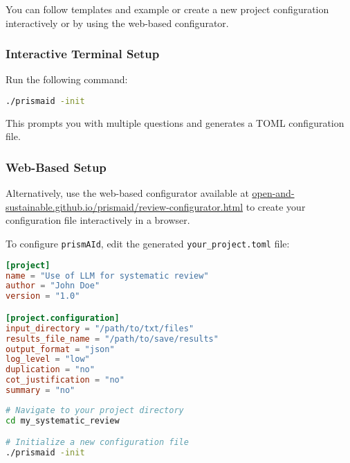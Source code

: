 You can follow templates and example or create a new project configuration interactively or by using the web-based configurator.

\subsubsection{Interactive Terminal Setup}
\begin{commandbox}
Run the following command:
\begin{lstlisting}[language=Bash]
./prismaid -init
\end{lstlisting}
\end{commandbox}

This prompts you with multiple questions and generates a TOML configuration file.

\subsubsection{Web-Based Setup}

Alternatively, use the web-based configurator available at \href{https://open-and-sustainable.github.io/prismaid/review-configurator.html}{open-and-sustainable.github.io/prismaid/review-configurator.html} to create your configuration file interactively in a browser.

\begin{configbox}
To configure \texttt{prismAId}, edit the generated \texttt{your\_project.toml} file:
\begin{lstlisting}[language=TOML]
[project]
name = "Use of LLM for systematic review"
author = "John Doe"
version = "1.0"

[project.configuration]
input_directory = "/path/to/txt/files"
results_file_name = "/path/to/save/results"
output_format = "json"
log_level = "low"
duplication = "no"
cot_justification = "no"
summary = "no"
\end{lstlisting}
\end{configbox}
\begin{commandbox}
\begin{lstlisting}[language=Bash]
# Navigate to your project directory
cd my_systematic_review

# Initialize a new configuration file
./prismaid -init
\end{lstlisting}
\end{commandbox}

